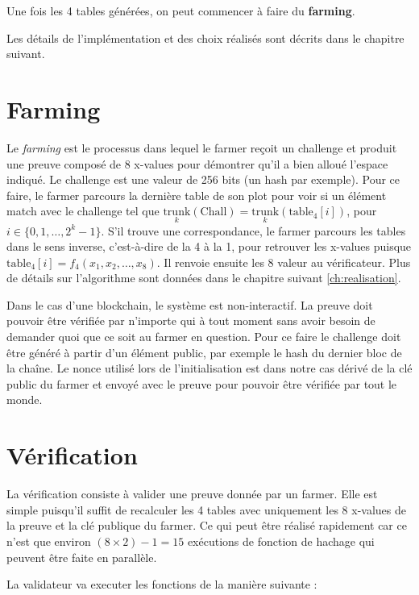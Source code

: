 Une fois les 4 tables générées, on peut commencer à faire du \textbf{farming}.

Les détails de l'implémentation et des choix réalisés sont décrits dans le chapitre suivant.

\section{Farming}

Le \emph{farming} est le processus dans lequel le farmer reçoit un challenge et produit une preuve composé de 8 x-values pour démontrer qu'il a bien alloué l'espace indiqué. Le challenge est une valeur de 256 bits (un hash par exemple). Pour ce faire, le farmer parcours la dernière table de son plot pour voir si un élément match avec le challenge tel que $\underset{k}{\mathrm{trunk}}(\mathrm{Chall})=\underset{k}{\mathrm{trunk}}(\mathrm{table_4}[i])$, pour $i \in \{0,1,\dots,2^k-1\}$. S'il trouve une correspondance, le farmer parcours les tables dans le sens inverse, c'est-à-dire de la 4 à la 1, pour retrouver les x-values puisque $\mathrm{table_4}[i]=f_4(x_1,x_2,\dots,x_8)$. Il renvoie ensuite les 8 valeur au vérificateur. Plus de détails sur l'algorithme sont données dans le chapitre suivant \ref{ch:realisation}.

Dans le cas d'une blockchain, le système est non-interactif. La preuve doit pouvoir être vérifiée par n'importe qui à tout moment sans avoir besoin de demander quoi que ce soit au farmer en question. Pour ce faire le challenge doit être généré à partir d'un élément public, par exemple le hash du dernier bloc de la chaîne. Le nonce utilisé lors de l'initialisation est dans notre cas dérivé de la clé public du farmer et envoyé avec le preuve pour pouvoir être vérifiée par tout le monde.

\section{Vérification}

La vérification consiste à valider une preuve donnée par un farmer. Elle est simple puisqu'il suffit de recalculer les 4 tables avec uniquement les 8 x-values de la preuve et la clé publique du farmer. Ce qui peut être réalisé rapidement car ce n'est que environ $(8 \times 2) - 1 = 15$ exécutions de fonction de hachage qui peuvent être faite en parallèle.

La validateur va executer les fonctions de la manière suivante :

